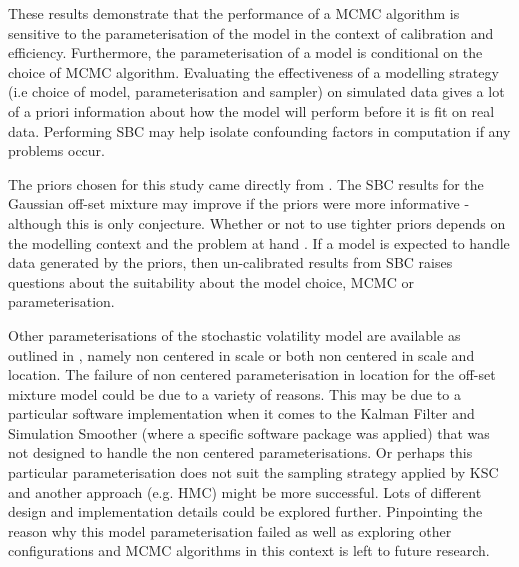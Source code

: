 \documentclass[12pt, a4paper]{article}
\begin{document}
These results demonstrate that the performance of a MCMC algorithm is sensitive to the parameterisation of the model in the context of calibration and efficiency. Furthermore, the parameterisation of a model is conditional on the choice of MCMC algorithm. Evaluating the effectiveness of a modelling strategy (i.e choice of model, parameterisation and sampler) on simulated data gives a lot of a priori information about how the model will perform before it is fit on real data. Performing SBC may help isolate confounding factors in computation if any problems occur. 

The priors chosen for this study came directly from \citet{kim1998stochastic}. The SBC results for the Gaussian off-set mixture may improve if the priors were more informative - although this is only conjecture. Whether or not to use tighter priors depends on the modelling context and the problem at hand \citep{gelman2017prior}. If a model is expected to handle data generated by the priors, then un-calibrated results from SBC raises questions about the suitability about the model choice, MCMC or parameterisation. 

Other parameterisations of the stochastic volatility model are available as outlined in \citet{strickland2008parameterisation}, namely non centered in scale or both non centered in scale and location. The failure of non centered parameterisation in location for the off-set mixture model could be due to a variety of reasons. This may be due to a particular software implementation when it comes to the Kalman Filter and Simulation Smoother (where a specific software package was applied) that was not designed to handle the non centered parameterisations. Or perhaps this particular parameterisation does not suit the sampling strategy applied by KSC and another approach (e.g. HMC) might be more successful. Lots of different design and implementation details could be explored further. Pinpointing the reason why this model parameterisation failed as well as exploring other configurations and MCMC algorithms in this context is left to future research.
\end{document}
